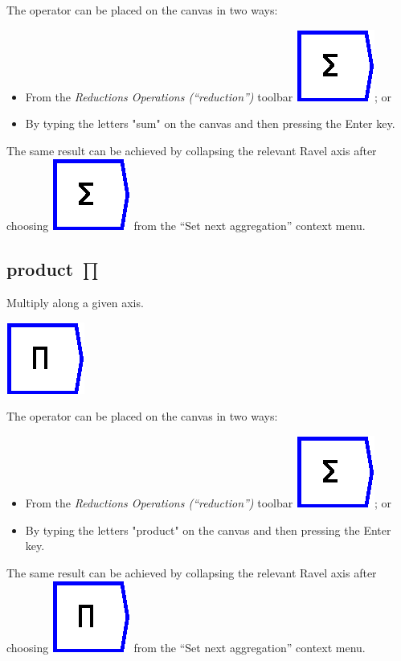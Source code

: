 The operator can be placed on the canvas in two ways:
\begin{itemize}
\item From the \emph{Reductions Operations (``reduction'')} toolbar \includegraphics{images/sum};
or 
\item By typing the letters "sum" on the canvas and then pressing the
Enter key.
\end{itemize}
The same result can be achieved by collapsing the relevant Ravel axis
after choosing \includegraphics{images/sum} from the ``Set next
aggregation'' context menu.

\subsection{product $\prod$}

\label{Operation:product} Multiply along a given axis.

\includegraphics{images/product}

The operator can be placed on the canvas in two ways:
\begin{itemize}
\item From the \emph{Reductions Operations (``reduction'')} toolbar \includegraphics{images/sum};
or 
\item By typing the letters "product" on the canvas and then pressing
the Enter key.
\end{itemize}
The same result can be achieved by collapsing the relevant Ravel axis
after choosing \includegraphics{images/product} from the ``Set next
aggregation'' context menu.

